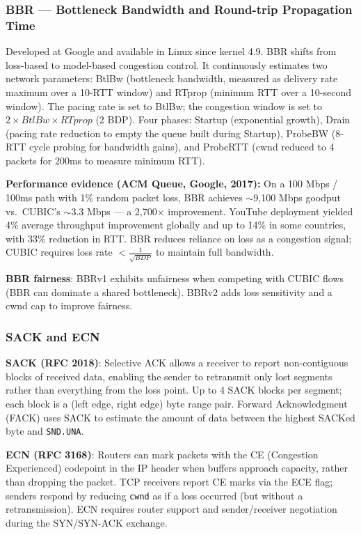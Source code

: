 \documentclass[11pt,letterpaper]{article}
\begin{document}
\subsubsection{BBR --- Bottleneck Bandwidth and Round-trip Propagation Time}

Developed at Google and available in Linux since kernel 4.9. BBR shifts from loss-based to model-based congestion control. It continuously estimates two network parameters: BtlBw (bottleneck bandwidth, measured as delivery rate maximum over a 10-RTT window) and RTprop (minimum RTT over a 10-second window). The pacing rate is set to BtlBw; the congestion window is set to $2 \times BtlBw \times RTprop$ (2 BDP). Four phases: Startup (exponential growth), Drain (pacing rate reduction to empty the queue built during Startup), ProbeBW (8-RTT cycle probing for bandwidth gains), and ProbeRTT (cwnd reduced to 4 packets for 200ms to measure minimum RTT). 

\textbf{Performance evidence (ACM Queue, Google, 2017):} On a 100 Mbps / 100ms path with 1\% random packet loss, BBR achieves $\sim$9,100 Mbps goodput vs.\ CUBIC's $\sim$3.3 Mbps --- a 2,700$\times$ improvement. YouTube deployment yielded 4\% average throughput improvement globally and up to 14\% in some countries, with 33\% reduction in RTT. BBR reduces reliance on loss as a congestion signal; CUBIC requires loss rate $< \frac{1}{\sqrt{BDP}}$ to maintain full bandwidth.

\textbf{BBR fairness}: BBRv1 exhibits unfairness when competing with CUBIC flows (BBR can dominate a shared bottleneck). BBRv2 adds loss sensitivity and a cwnd cap to improve fairness.

\subsubsection{SACK and ECN}

\textbf{SACK (RFC 2018)}: Selective ACK allows a receiver to report non-contiguous blocks of received data, enabling the sender to retransmit only lost segments rather than everything from the loss point. Up to 4 SACK blocks per segment; each block is a (left edge, right edge) byte range pair. Forward Acknowledgment (FACK) uses SACK to estimate the amount of data between the highest SACKed byte and \texttt{SND.UNA}.

\textbf{ECN (RFC 3168)}: Routers can mark packets with the CE (Congestion Experienced) codepoint in the IP header when buffers approach capacity, rather than dropping the packet. TCP receivers report CE marks via the ECE flag; senders respond by reducing \texttt{cwnd} as if a loss occurred (but without a retransmission). ECN requires router support and sender/receiver negotiation during the SYN/SYN-ACK exchange.
\end{document}

